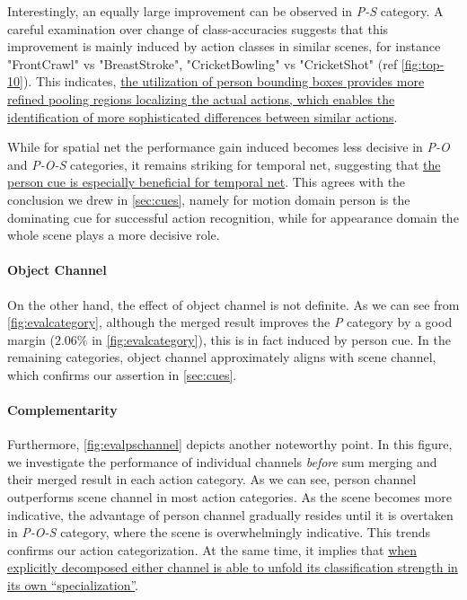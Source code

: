 Interestingly, an equally large improvement can be observed in \textit{P-S} category.
A careful examination over change of class-accuracies suggests that this improvement is mainly induced by action classes in similar scenes, for instance "FrontCrawl" vs "BreastStroke", "CricketBowling" vs "CricketShot" (ref \autoref{fig:top-10}).
This indicates, \ul{the utilization of person bounding boxes provides more refined pooling regions localizing the actual actions, which enables the identification of more sophisticated differences between similar actions}.

While for spatial net the performance gain induced becomes less decisive in \textit{P-O} and \textit{P-O-S} categories, it remains striking for temporal net, suggesting that \ul{the person cue is especially beneficial for temporal net}.
This agrees with the conclusion we drew in \autoref{sec:cues}, namely for motion domain person is the dominating cue for successful action recognition, while for appearance domain the whole scene plays a more decisive role.

\paragraph{Object Channel} On the other hand, the effect of object channel is not definite.
As we can see from \autoref{fig:evalcategory}, although the merged result improves the \textit{P} category by a good margin ($ 2.06\% $ in \autoref{fig:evalcategory}), this is in fact induced by person cue.
In the remaining categories, object channel approximately aligns with scene channel, which confirms our assertion in \autoref{sec:cues}.

\paragraph{Complementarity}Furthermore, \autoref{fig:evalpschannel} depicts another noteworthy point.
In this figure, we investigate the performance of individual channels \textit{before} sum merging and their merged result in each action category.
As we can see, person channel outperforms scene channel in most action categories.
As the scene becomes more indicative, the advantage of person channel gradually resides until it is overtaken in \textit{P-O-S} category, where the scene is overwhelmingly indicative.
This trends confirms our action categorization.
At the same time, it implies that \ul{when explicitly decomposed either channel is able to unfold its classification strength in its own ``specialization''}.

